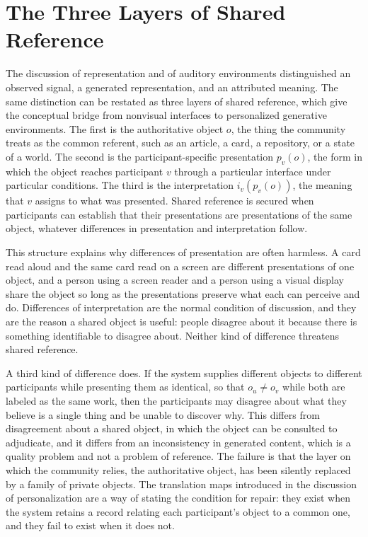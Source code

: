 \documentclass[11pt]{article}
\theoremstyle{remark}
\begin{document}
\section{The Three Layers of Shared Reference}
\label{sec:three-layers}

The discussion of representation and of auditory environments distinguished an observed signal, a generated representation, and an attributed meaning. The same distinction can be restated as three layers of shared reference, which give the conceptual bridge from nonvisual interfaces to personalized generative environments. The first is the authoritative object $o$, the thing the community treats as the common referent, such as an article, a card, a repository, or a state of a world. The second is the participant-specific presentation $p_v(o)$, the form in which the object reaches participant $v$ through a particular interface under particular conditions. The third is the interpretation $i_v(p_v(o))$, the meaning that $v$ assigns to what was presented. Shared reference is secured when participants can establish that their presentations are presentations of the same object, whatever differences in presentation and interpretation follow.

This structure explains why differences of presentation are often harmless. A card read aloud and the same card read on a screen are different presentations of one object, and a person using a screen reader and a person using a visual display share the object so long as the presentations preserve what each can perceive and do. Differences of interpretation are the normal condition of discussion, and they are the reason a shared object is useful: people disagree about it because there is something identifiable to disagree about. Neither kind of difference threatens shared reference.

A third kind of difference does. If the system supplies different objects to different participants while presenting them as identical, so that $o_u\neq o_v$ while both are labeled as the same work, then the participants may disagree about what they believe is a single thing and be unable to discover why. This differs from disagreement about a shared object, in which the object can be consulted to adjudicate, and it differs from an inconsistency in generated content, which is a quality problem and not a problem of reference. The failure is that the layer on which the community relies, the authoritative object, has been silently replaced by a family of private objects. The translation maps introduced in the discussion of personalization are a way of stating the condition for repair: they exist when the system retains a record relating each participant's object to a common one, and they fail to exist when it does not.
\end{document}
